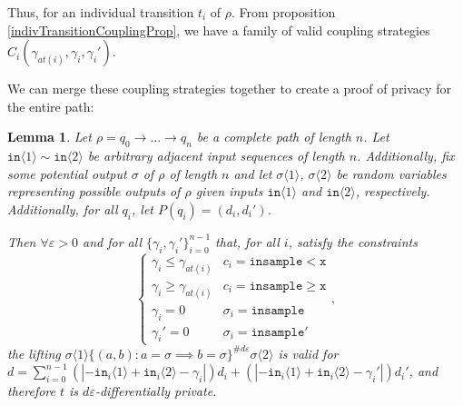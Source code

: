 \documentclass[12pt]{article}
\newcommand{\gguard}[1][x]{\texttt{insample}\geq #1}
\newcommand{\lguard}[1][x]{\texttt{insample} < #1}
\newcommand{\brangle}[1]{\langle #1 \rangle}
\newtheorem{lemma}[thm]{Lemma}
\theoremstyle{definition}
\begin{document}
Thus, for an individual transition $t_i$ of $\rho$. From proposition \ref{indivTransitionCouplingProp}, we have a family of valid coupling strategies $C_i(\gamma_{at(i)}, \gamma_i, \gamma_i')$. 

We can merge these coupling strategies together to create a proof of privacy for the entire path: 

\begin{lemma}\label{multTransitionsCouplingProof}
    Let $\rho = q_0\to \ldots \to q_n$ be a complete path of length $n$. Let $\texttt{in}\brangle{1}\sim \texttt{in}\brangle{2}$ be arbitrary adjacent input sequences of length $n$. Additionally, fix some potential output $\sigma$ of $\rho$ of length $n$ and let $\sigma\brangle{1}$, $\sigma\brangle{2}$ be random variables representing possible outputs of $\rho$ given inputs $\texttt{in}\brangle{1}$ and $\texttt{in}\brangle{2}$, respectively. Additionally, for all $q_i$, let $P(q_i) = (d_i, d_i')$.

    Then $\forall \varepsilon>0$ and for all $\{\gamma_i, \gamma_i'\}_{i=0}^{n-1}$ that, for all $i$, satisfy the constraints \[
        \begin{cases}
          \gamma_i\leq\gamma_{at(i)} & c_i = \lguard[\texttt{x}]\\
          \gamma_i\geq\gamma_{at(i)} & c_i = \gguard[\texttt{x}]\\
          \gamma_i=0 & \sigma_i = \texttt{insample}\\
          \gamma_i'=0 & \sigma_i = \texttt{insample}'
        \end{cases},
      \]
      the lifting $\sigma\brangle{1}\{(a, b): a=\sigma\implies b=\sigma\}^{\#d\varepsilon}\sigma\brangle{2}$ is valid for $d = \sum_{i=0}^{n-1}(|-\texttt{in}_i\brangle{1}+\texttt{in}_i\brangle{2}-\gamma_i|)d_i+(|-\texttt{in}_i\brangle{1}+\texttt{in}_i\brangle{2}-\gamma_i'|)d_i'$, and therefore $t$ is $d\varepsilon$-differentially private. 
\end{lemma}
\end{document}
